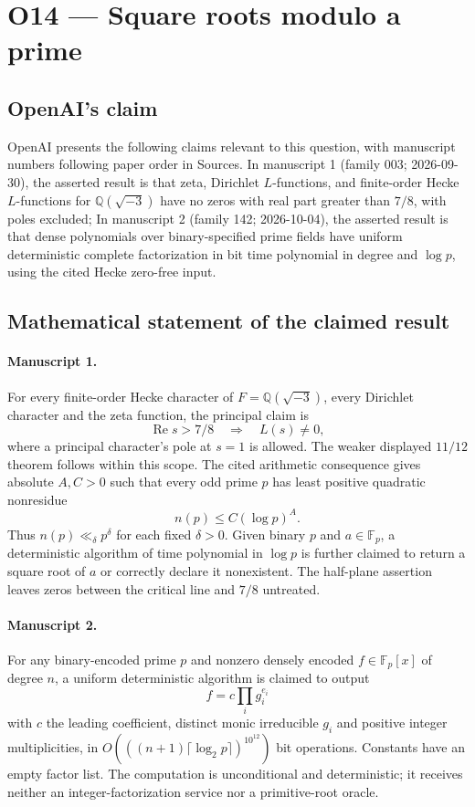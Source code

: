 \documentclass[11pt]{article}
\begin{document}
\section*{O14 — Square roots modulo a prime}

\subsection{OpenAI's claim}
OpenAI presents the following claims relevant to this question, with manuscript numbers following paper order in Sources. In manuscript 1 (family 003; 2026-09-30), the asserted result is that zeta, Dirichlet $L$-functions, and finite-order Hecke $L$-functions for $\mathbb Q(\sqrt{-3})$ have no zeros with real part greater than $7/8$, with poles excluded; In manuscript 2 (family 142; 2026-10-04), the asserted result is that dense polynomials over binary-specified prime fields have uniform deterministic complete factorization in bit time polynomial in degree and $\log p$, using the cited Hecke zero-free input.

\subsection{Mathematical statement of the claimed result}
\paragraph{Manuscript 1.}
For every finite-order Hecke character of $F=\mathbb Q(\sqrt{-3})$, every Dirichlet character and the zeta function, the principal claim is
\[
 \operatorname{Re}s>7/8\quad\Longrightarrow\quad L(s)\ne0,
\]
where a principal character's pole at $s=1$ is allowed. The weaker displayed $11/12$ theorem follows within this scope. The cited arithmetic consequence gives absolute $A,C>0$ such that every odd prime $p$ has least positive quadratic nonresidue
\[
 n(p)\le C(\log p)^A.
\]
Thus $n(p)\ll_{\delta} p^{\delta}$ for each fixed $\delta>0$. Given binary $p$ and $a\in\mathbb F_p$, a deterministic algorithm of time polynomial in $\log p$ is further claimed to return a square root of $a$ or correctly declare it nonexistent. The half-plane assertion leaves zeros between the critical line and $7/8$ untreated.

\paragraph{Manuscript 2.}
For any binary-encoded prime $p$ and nonzero densely encoded $f\in\mathbb F_p[x]$ of degree $n$, a uniform deterministic algorithm is claimed to output
\[
 f=c\prod_i g_i^{e_i}
\]
with $c$ the leading coefficient, distinct monic irreducible $g_i$ and positive integer multiplicities, in $O(((n+1)\lceil\log_2p\rceil)^{10^{12}})$ bit operations. Constants have an empty factor list. The computation is unconditional and deterministic; it receives neither an integer-factorization service nor a primitive-root oracle.
\end{document}
